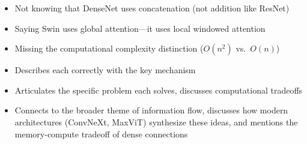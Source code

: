 \begin{interviewq}
\redflags
\begin{itemize}
    \item Not knowing that DenseNet uses concatenation (not addition like ResNet)
    \item Saying Swin uses global attention---it uses local windowed attention
    \item Missing the computational complexity distinction ($O(n^2)$ vs.\ $O(n)$)
\end{itemize}


\goodgreat
\begin{itemize}
    \item {} Describes each correctly with the key mechanism
    \item {} Articulates the specific problem each solves, discusses computational tradeoffs
    \item {} Connects to the broader theme of information flow, discusses how modern architectures (ConvNeXt, MaxViT) synthesize these ideas, and mentions the memory-compute tradeoff of dense connections
\end{itemize}

\end{interviewq}